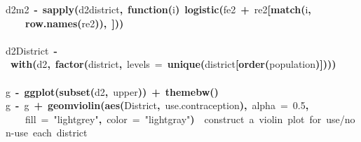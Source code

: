 \documentclass{article}
\makeatletter
\newcommand{\hlnumber}[1]{\textcolor[rgb]{0,0,0}{#1}}%
\newcommand{\hlfunctioncall}[1]{\textcolor[rgb]{.5,0,.33}{\textbf{#1}}}%
\newcommand{\hlstring}[1]{\textcolor[rgb]{.6,.6,1}{#1}}%
\newcommand{\hlkeyword}[1]{\textbf{#1}}%
\newcommand{\hlargument}[1]{\textcolor[rgb]{.69,.25,.02}{#1}}%
\newcommand{\hlcomment}[1]{\textcolor[rgb]{.18,.6,.34}{#1}}%
\newcommand{\hlformalargs}[1]{\hlargument{#1}}%
\newcommand{\hlassignement}[1]{\textbf{#1}}%
\newcommand{\hlsymbol}[1]{#1}%
\newcommand{\hlstd}[1]{\textcolor[rgb]{0,0,0}{#1}}%
\newenvironment{kframe}{%
 \def\FrameCommand##1{\hskip\@totalleftmargin \hskip-\fboxsep
 \colorbox{shadecolor}{##1}\hskip-\fboxsep
     \hskip-\linewidth \hskip-\@totalleftmargin \hskip\columnwidth}%
 \MakeFramed {\advance\hsize-\width
   \@totalleftmargin\z@ \linewidth\hsize
   \@setminipage}}%
 {\par\unskip\endMakeFramed}
\newenvironment{knitrout}{}{} %
\makeatother
\begin{document}
\begin{knitrout}
{\begin{kframe}
\begin{flushleft}
\hlstd{}\hlsymbol{d2}\hlkeyword{\usebox{\hlnormalsizeboxdollar}}\hlsymbol{m2}{\ }\hlassignement{\usebox{\hlnormalsizeboxlessthan}-}{\ }\hlfunctioncall{sapply}\hlkeyword{(}\hlsymbol{d2}\hlkeyword{\usebox{\hlnormalsizeboxdollar}}\hlsymbol{district}\hlkeyword{,}{\ }\hlkeyword{function}\hlkeyword{(}\hlformalargs{i}\hlkeyword{)}{\ }\hlfunctioncall{logistic}\hlkeyword{(}\hlsymbol{fe2}{\ }\hlkeyword{+}{\ }\hlsymbol{re2}\hlkeyword{[}\hlfunctioncall{match}\hlkeyword{(}\hlsymbol{i}\hlkeyword{,}\hspace*{\fill}\\
\hlstd{}{\ }{\ }{\ }{\ }\hlfunctioncall{row.names}\hlkeyword{(}\hlsymbol{re2}\hlkeyword{)}\hlkeyword{)}\hlkeyword{,}{\ }\hlkeyword{]}\hlkeyword{)}\hlkeyword{)}\hspace*{\fill}\\
\hlstd{}\hspace*{\fill}\\
\hlstd{}\hlsymbol{d2}\hlkeyword{\usebox{\hlnormalsizeboxdollar}}\hlsymbol{District}{\ }\hlassignement{\usebox{\hlnormalsizeboxlessthan}-}{\ }\hlfunctioncall{with}\hlkeyword{(}\hlsymbol{d2}\hlkeyword{,}{\ }\hlfunctioncall{factor}\hlkeyword{(}\hlsymbol{district}\hlkeyword{,}{\ }\hlargument{levels}{\ }\hlargument{=}{\ }\hlfunctioncall{unique}\hlkeyword{(}\hlsymbol{district}\hlkeyword{[}\hlfunctioncall{order}\hlkeyword{(}\hlsymbol{population}\hlkeyword{)}\hlkeyword{]}\hlkeyword{)}\hlkeyword{)}\hlkeyword{)}\hspace*{\fill}\\
\hlstd{}\hspace*{\fill}\\
\hlstd{}\hlsymbol{g}{\ }\hlassignement{\usebox{\hlnormalsizeboxlessthan}-}{\ }\hlfunctioncall{ggplot}\hlkeyword{(}\hlfunctioncall{subset}\hlkeyword{(}\hlsymbol{d2}\hlkeyword{,}{\ }\hlsymbol{upper}\hlkeyword{)}\hlkeyword{)}{\ }\hlkeyword{+}{\ }\hlfunctioncall{theme\usebox{\hlnormalsizeboxunderscore}bw}\hlkeyword{(}\hlkeyword{)}\hspace*{\fill}\\
\hlstd{}\hlsymbol{g}{\ }\hlassignement{\usebox{\hlnormalsizeboxlessthan}-}{\ }\hlsymbol{g}{\ }\hlkeyword{+}{\ }\hlfunctioncall{geom\usebox{\hlnormalsizeboxunderscore}violin}\hlkeyword{(}\hlfunctioncall{aes}\hlkeyword{(}\hlsymbol{District}\hlkeyword{,}{\ }\hlsymbol{use.contraception}\hlkeyword{)}\hlkeyword{,}{\ }\hlargument{alpha}{\ }\hlargument{=}{\ }\hlnumber{0.5}\hlkeyword{,}\hspace*{\fill}\\
\hlstd{}{\ }{\ }{\ }{\ }\hlargument{fill}{\ }\hlargument{=}{\ }\hlstring{"{}lightgrey"{}}\hlkeyword{,}{\ }\hlargument{color}{\ }\hlargument{=}{\ }\hlstring{"{}lightgray"{}}\hlkeyword{)}{\ }{\ }\hlcomment{\usebox{\hlnormalsizeboxhash}\usebox{\hlnormalsizeboxhash}{\ }construct{\ }a{\ }violin{\ }plot{\ }for{\ }use/non-use{\ }each{\ }district}\hspace*{\fill}\\

\end{flushleft}
\end{kframe}}
\end{knitrout}
\end{document}
